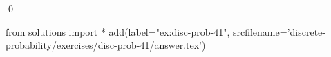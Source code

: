 
\begin{ex} 
  \label{ex:disc-prob-41}
  
  \qed
\end{ex} 
\begin{python0}
from solutions import *
add(label="ex:disc-prob-41",
    srcfilename='discrete-probability/exercises/disc-prob-41/answer.tex') 
\end{python0}
